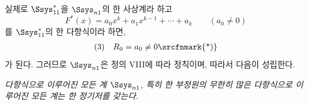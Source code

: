 
실제로 $\Ssys^*_{11}$을 $\Ssys_{n1}$의 한 사상계라 하고
\[
  F^*(x)=a_0x^k+a_1x^{k-1}+\cdots+a_k\qquad(a_0\ne0)
\]
를 $\Ssys^*_{11}$의 한 다항식이라 하면,
\[
\begin{array}{@{}l@{\quad}c@{}}
(3)& R_0=a_0\ne0\text{\srcfnmark{*)}}
\end{array}
\]
가 된다. 그러므로 $\Ssys_{n1}$은 정의 VIII에 따라 정칙이며, 따라서 다음이 성립한다.

\emph{다항식으로 이루어진 모든 계 $\Ssys_{n1}$, 특히 한 부정원의 무한히 많은 다항식으로 이루어진 모든 계는 한 정기저를 갖는다.}
